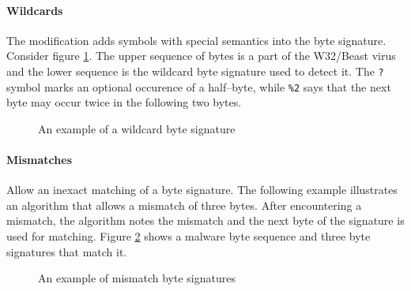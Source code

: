 \paragraph*{Wildcards} The modification adds symbols with special semantics into the byte signature. Consider figure \ref{fig_wildcards}. The upper sequence of bytes is a part of the W32/Beast virus and the lower sequence is the wildcard byte signature used to detect it. The \texttt{?} symbol marks an optional occurence of a half--byte, while \texttt{\%2} says that the next byte may occur twice in the following two bytes.

\begin{figure}[H]
    \centering
    \caption{An example of a wildcard byte signature}
    \label{fig_wildcards}
\end{figure}

\paragraph*{Mismatches} Allow an inexact matching of a byte signature. The following example illustrates an algorithm that allows a mismatch of three bytes. After encountering a mismatch, the algorithm notes the mismatch and the next byte of the signature is used for matching. Figure \ref{fig_mismatch} shows a malware byte sequence and three byte signatures that match it.

\begin{figure}[H]
    \centering
    \caption{An example of mismatch byte signatures}
    \label{fig_mismatch}
\end{figure}

